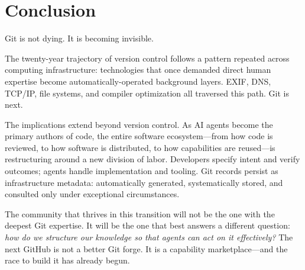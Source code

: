 \documentclass[12pt]{article}
\begin{document}
\section{Conclusion}

Git is not dying. It is becoming invisible.

The twenty-year trajectory of version control follows a pattern repeated across computing infrastructure: technologies that once demanded direct human expertise become automatically-operated background layers. EXIF, DNS, TCP/IP, file systems, and compiler optimization all traversed this path. Git is next.

The implications extend beyond version control. As AI agents become the primary authors of code, the entire software ecosystem---from how code is reviewed, to how software is distributed, to how capabilities are reused---is restructuring around a new division of labor. Developers specify intent and verify outcomes; agents handle implementation and tooling. Git records persist as infrastructure metadata: automatically generated, systematically stored, and consulted only under exceptional circumstances.

The community that thrives in this transition will not be the one with the deepest Git expertise. It will be the one that best answers a different question: \textit{how do we structure our knowledge so that agents can act on it effectively?} The next GitHub is not a better Git forge. It is a capability marketplace---and the race to build it has already begun.



\end{document}
